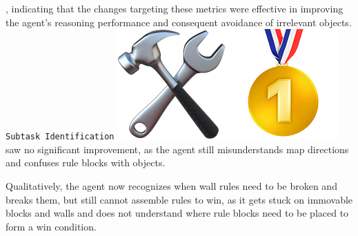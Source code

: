 , indicating that the changes targeting these metrics were effective in
improving the agent's reasoning performance and consequent avoidance of
irrelevant objects. \texttt{Subtask Identification}
\includegraphics[scale=0.07]{figs/emojis/emoji_5.png}
saw no significant improvement, as the agent still misunderstands map directions
and confuses rule blocks with objects.

Qualitatively, the agent now recognizes when wall rules need to be broken and
breaks them, but still cannot assemble rules to win, as it gets stuck on
immovable blocks and walls and does not understand where rule blocks need to be
placed to form a win condition.

